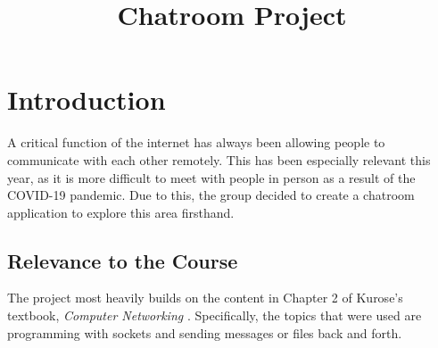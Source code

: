 \documentclass{article}
\begin{document}
\sloppy



\title{Chatroom Project}
%
\address{}


\maketitle


%



%
%
\section{Introduction}
\label{sec:intro}
A critical function of the internet has always been allowing people to communicate with each other remotely. This has been especially relevant this year, as it is more difficult to meet with people in person as a result of the COVID-19 pandemic. Due to this, the group decided to create a chatroom application to explore this area firsthand. 

\subsection{Relevance to the Course}

The project most heavily builds on the content in Chapter 2 of Kurose's textbook, \emph{Computer Networking} \cite{kurose}. Specifically, the topics that were used are programming with sockets and sending messages or files back and forth. 
\end{document}
